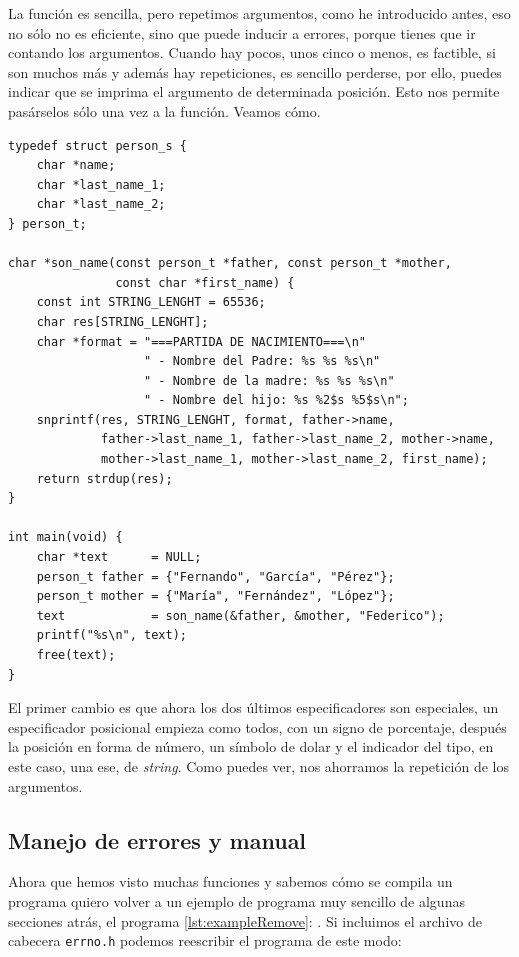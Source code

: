 \documentclass[a4paper]{article}
\begin{document}
La función es sencilla, pero repetimos argumentos, como he introducido antes,
eso no sólo no es eficiente, sino que puede inducir a errores, porque tienes
que ir contando los argumentos. Cuando hay pocos, unos cinco o menos, es
factible, si son muchos más y además hay repeticiones, es sencillo perderse,
por ello, puedes indicar que se imprima el argumento de determinada posición.
Esto nos permite pasárselos sólo una vez a la función. Veamos cómo.

\noindent
\begin{minipage}[H]{\linewidth}
\mbox{}
\begin{lstlisting}[style=C,
caption={Ejemplo de impresión con argumento repetido y especificador posicional},
label={lst:repeatedMessagesPos}]
typedef struct person_s {
    char *name;
    char *last_name_1;
    char *last_name_2;
} person_t;

char *son_name(const person_t *father, const person_t *mother,
               const char *first_name) {
    const int STRING_LENGHT = 65536;
    char res[STRING_LENGHT];
    char *format = "===PARTIDA DE NACIMIENTO===\n"
                   " - Nombre del Padre: %s %s %s\n"
                   " - Nombre de la madre: %s %s %s\n"
                   " - Nombre del hijo: %s %2$s %5$s\n";
    snprintf(res, STRING_LENGHT, format, father->name,
             father->last_name_1, father->last_name_2, mother->name,
             mother->last_name_1, mother->last_name_2, first_name);
    return strdup(res);
}

int main(void) {
    char *text      = NULL;
    person_t father = {"Fernando", "García", "Pérez"};
    person_t mother = {"María", "Fernández", "López"};
    text            = son_name(&father, &mother, "Federico");
    printf("%s\n", text);
    free(text);
}
\end{lstlisting}
\end{minipage}

El primer cambio es que ahora los dos últimos especificadores son especiales,
un especificador posicional empieza como todos, con un signo de porcentaje,
después la posición en forma de número, un símbolo de dolar y el indicador
del tipo, en este caso, una ese, de \textit{string}. Como puedes ver, nos
ahorramos la repetición de los argumentos.

\subsection{Manejo de errores y manual}
Ahora que hemos visto muchas funciones y sabemos cómo se compila un programa
quiero volver a un ejemplo de programa muy sencillo de algunas secciones atrás,
el programa \ref{lst:exampleRemove}: . Si incluimos el
archivo de cabecera \verb!errno.h! podemos reescribir el programa
de este modo:
\end{document}
